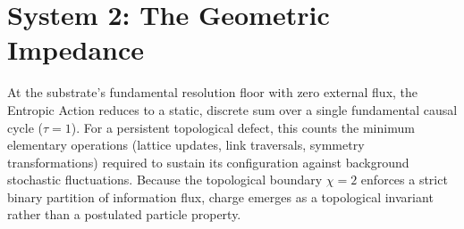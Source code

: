 \section{System 2: The Geometric Impedance}
\label{sec:system2_geometric_impedance}








At the substrate's fundamental resolution floor with zero external flux, the Entropic Action reduces to a static, discrete sum over a single fundamental causal cycle ($\tau=1$). For a persistent topological defect, this counts the minimum elementary operations (lattice updates, link traversals, symmetry transformations) required to sustain its configuration against background stochastic fluctuations. Because the topological boundary $\chi=2$ enforces a strict binary partition of information flux, charge emerges as a topological invariant rather than a postulated particle property.

